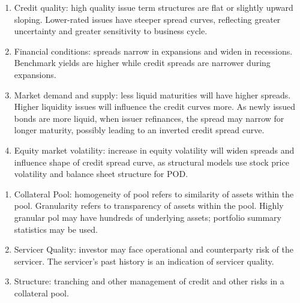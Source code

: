 \begin{remark} 
\begin{enumerate}[label=\roman*.]
\setlength{\itemsep}{0pt}
\item Credit quality: high quality issue term structures are flat or slightly upward sloping. Lower-rated issues have steeper spread curves, reflecting greater uncertainty and greater sensitivity to business cycle.
\item Financial conditions: spreads narrow in expansions and widen in recessions. Benchmark yields are higher while credit spreads are narrower during expansions.
\item Market demand and supply: less liquid maturities will have higher spreads. Higher liquidity issues will influence the credit curves more. As newly issued bonds are more liquid, when issuer refinances, the spread may narrow for longer maturity, possibly leading to an inverted credit spread curve.
\item Equity market volatility: increase in equity volatility will widen spreads and influence shape of credit spread curve, as structural models use stock price volatility and balance sheet structure for POD.
\end{enumerate}
\end{remark}

\begin{remark} 
\begin{enumerate}[label=\roman*.]
\setlength{\itemsep}{0pt}
\item Collateral Pool: homogeneity of pool refers to similarity of assets within the pool. Granularity refers to transparency of assets within the pool. Highly granular pol may have hundreds of underlying assets; portfolio summary statistics may be used.
\item Servicer Quality: investor may face operational and counterparty risk of the servicer. The servicer's past history is an indication of servicer quality.
\item Structure: tranching and other management of credit and other risks in a collateral pool.
\end{enumerate}
\end{remark}

